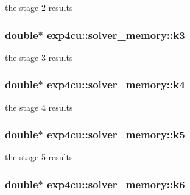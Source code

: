 the stage 2 results 

\subsubsection[{\texorpdfstring{k3}{k3}}]{\setlength{\rightskip}{0pt plus 5cm}double$\ast$ exp4cu\+::solver\+\_\+memory\+::k3}\hypertarget{structexp4cu_1_1solver__memory_ad874f97ba264e3cefb19482eef2a729d}{}\label{structexp4cu_1_1solver__memory_ad874f97ba264e3cefb19482eef2a729d}


the stage 3 results 

\subsubsection[{\texorpdfstring{k4}{k4}}]{\setlength{\rightskip}{0pt plus 5cm}double$\ast$ exp4cu\+::solver\+\_\+memory\+::k4}\hypertarget{structexp4cu_1_1solver__memory_a060f44ce2caacb3fc536671b591e11a2}{}\label{structexp4cu_1_1solver__memory_a060f44ce2caacb3fc536671b591e11a2}


the stage 4 results 

\subsubsection[{\texorpdfstring{k5}{k5}}]{\setlength{\rightskip}{0pt plus 5cm}double$\ast$ exp4cu\+::solver\+\_\+memory\+::k5}\hypertarget{structexp4cu_1_1solver__memory_a749746fa09b01076ee56c0402d003fb7}{}\label{structexp4cu_1_1solver__memory_a749746fa09b01076ee56c0402d003fb7}


the stage 5 results 

\subsubsection[{\texorpdfstring{k6}{k6}}]{\setlength{\rightskip}{0pt plus 5cm}double$\ast$ exp4cu\+::solver\+\_\+memory\+::k6}\hypertarget{structexp4cu_1_1solver__memory_a8ccbe7fd464f064245b77c2df44956ef}{}\label{structexp4cu_1_1solver__memory_a8ccbe7fd464f064245b77c2df44956ef}


